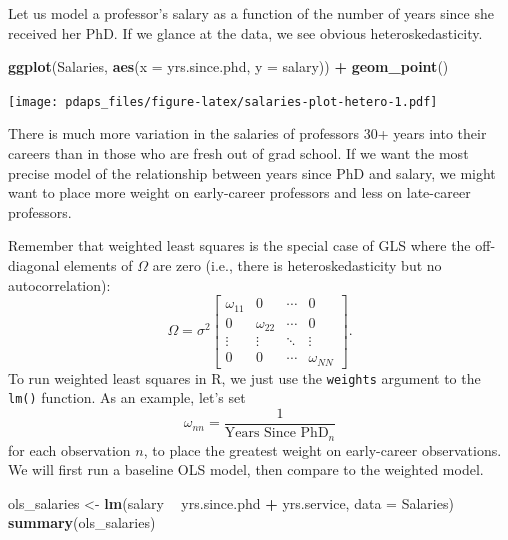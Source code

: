 \documentclass[12pt,oneside,openany]{book}
\newenvironment{Shaded}{\begin{snugshade}}{\end{snugshade}}
\newcommand{\KeywordTok}[1]{\textcolor[rgb]{0.13,0.29,0.53}{\textbf{#1}}}
\newcommand{\DataTypeTok}[1]{\textcolor[rgb]{0.13,0.29,0.53}{#1}}
\newcommand{\StringTok}[1]{\textcolor[rgb]{0.31,0.60,0.02}{#1}}
\newcommand{\OperatorTok}[1]{\textcolor[rgb]{0.81,0.36,0.00}{\textbf{#1}}}
\newcommand{\NormalTok}[1]{#1}
\begin{document}
Let us model a professor's salary as a function of the number of years
since she received her PhD. If we glance at the data, we see obvious
heteroskedasticity.

\begin{Shaded}
\begin{Highlighting}[]
\KeywordTok{ggplot}\NormalTok{(Salaries, }\KeywordTok{aes}\NormalTok{(}\DataTypeTok{x =}\NormalTok{ yrs.since.phd, }\DataTypeTok{y =}\NormalTok{ salary)) }\OperatorTok{+}
\StringTok{    }\KeywordTok{geom_point}\NormalTok{()}
\end{Highlighting}
\end{Shaded}

\texttt{[image: pdaps\_files/figure-latex/salaries-plot-hetero-1.pdf]}

There is much more variation in the salaries of professors 30+ years
into their careers than in those who are fresh out of grad school. If we
want the most precise model of the relationship between years since PhD
and salary, we might want to place more weight on early-career
professors and less on late-career professors.

Remember that weighted least squares is the special case of GLS where
the off-diagonal elements of \(\Omega\) are zero (i.e., there is
heteroskedasticity but no autocorrelation): \[
\Omega = \sigma^2 \begin{bmatrix}
  \omega_{11} & 0 & \cdots & 0 \\
  0 & \omega_{22} & \cdots & 0 \\
  \vdots & \vdots & \ddots & \vdots \\
  0 & 0 & \cdots & \omega_{NN}
\end{bmatrix}.
\] To run weighted least squares in R, we just use the \texttt{weights}
argument to the \texttt{lm()} function. As an example, let's set \[
\omega_{nn} = \frac{1}{\text{Years Since PhD}_n}
\] for each observation \(n\), to place the greatest weight on
early-career observations. We will first run a baseline OLS model, then
compare to the weighted model.

\begin{Shaded}
\begin{Highlighting}[]
\NormalTok{ols_salaries <-}\StringTok{ }\KeywordTok{lm}\NormalTok{(salary }\OperatorTok{~}\StringTok{ }\NormalTok{yrs.since.phd }\OperatorTok{+}\StringTok{ }\NormalTok{yrs.service,}
                   \DataTypeTok{data =}\NormalTok{ Salaries)}
\KeywordTok{summary}\NormalTok{(ols_salaries)}
\end{Highlighting}
\end{Shaded}
\end{document}
